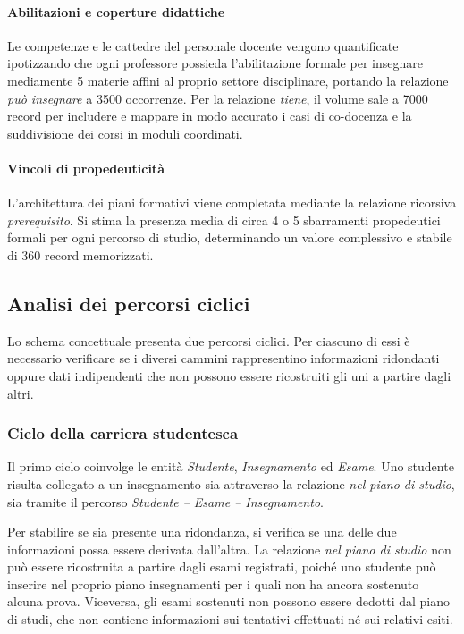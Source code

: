 \paragraph{Abilitazioni e coperture didattiche}
Le competenze e le cattedre del personale docente vengono quantificate ipotizzando che ogni professore possieda l'abilitazione formale per insegnare mediamente \num{5} materie affini al proprio settore disciplinare, portando la relazione \textit{può insegnare} a \num{3500} occorrenze.
Per la relazione \textit{tiene}, il volume sale a \num{7000} record per includere e mappare in modo accurato i casi di co-docenza e la suddivisione dei corsi in moduli coordinati.

\paragraph{Vincoli di propedeuticità}
L'architettura dei piani formativi viene completata mediante la relazione ricorsiva \textit{prerequisito}.
Si stima la presenza media di circa \num{4} o \num{5} sbarramenti propedeutici formali per ogni percorso di studio, determinando un valore complessivo e stabile di \num{360} record memorizzati.

\subsection{Analisi dei percorsi ciclici}
\label{ssec:analisi-dei-percorsi-ciclici}

Lo schema concettuale presenta due percorsi ciclici. Per ciascuno di essi è necessario verificare se i diversi cammini rappresentino informazioni ridondanti oppure dati indipendenti che non possono essere ricostruiti gli uni a partire dagli altri.

\subsubsection{Ciclo della carriera studentesca}
\label{sssec:ciclo-della-carriera-studentesca}

Il primo ciclo coinvolge le entità \textit{Studente}, \textit{Insegnamento} ed \textit{Esame}. Uno studente risulta collegato a un insegnamento sia attraverso la relazione \textit{nel piano di studio}, sia tramite il percorso \textit{Studente -- Esame -- Insegnamento}.

Per stabilire se sia presente una ridondanza, si verifica se una delle due informazioni possa essere derivata dall'altra. La relazione \textit{nel piano di studio} non può essere ricostruita a partire dagli esami registrati, poiché uno studente può inserire nel proprio piano insegnamenti per i quali non ha ancora sostenuto alcuna prova. Viceversa, gli esami sostenuti non possono essere dedotti dal piano di studi, che non contiene informazioni sui tentativi effettuati né sui relativi esiti.


